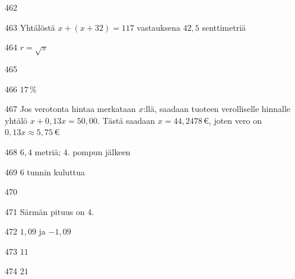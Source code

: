 \begin{Vastaus}{462}
	
\end{Vastaus}
\begin{Vastaus}{463}
	Yhtälöstä $x+(x+32)=117$ vastauksena $42,5$ senttimetriä
	
\end{Vastaus}
\begin{Vastaus}{464}
	$r=\sqrt{\pi}$
	
\end{Vastaus}
\begin{Vastaus}{465}
	
\end{Vastaus}
\begin{Vastaus}{466}
		 $17\,\%$
	
\end{Vastaus}
\begin{Vastaus}{467}
	Jos verotonta hintaa merkataan $x$:llä, saadaan tuoteen verolliselle hinnalle yhtälö $x+0,13x=50,00$. Tästä saadaan $x=44,2478$\,€, joten vero on $0,13x\approx 5,75$\,€
	
\end{Vastaus}
\begin{Vastaus}{468}
	 $6,4$ metriä; $4$. pompun jälkeen
	
\end{Vastaus}
\begin{Vastaus}{469}
	$6$ tunnin kuluttua
	
\end{Vastaus}
\begin{Vastaus}{470}
	
\end{Vastaus}
\begin{Vastaus}{471}
Särmän pituus on $4$.
	
\end{Vastaus}
\begin{Vastaus}{472}
	$1,09$ ja $-1,09$
	
\end{Vastaus}
\begin{Vastaus}{473}
	$11$
	
\end{Vastaus}
\begin{Vastaus}{474}
	$21$
	
\end{Vastaus}
